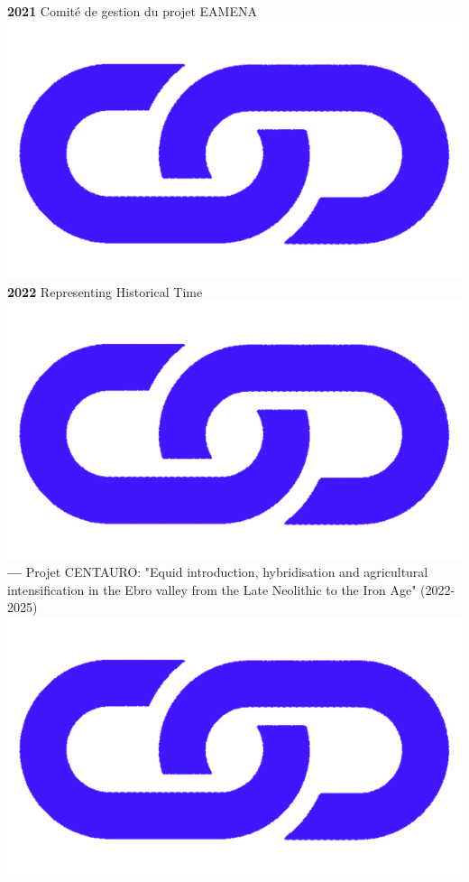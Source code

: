 \documentclass{article}
\begin{document}
\textbf{2021} Comité de gestion du projet EAMENA \href{https://eamena.org/}{\includegraphics[scale=0.02]{link_darkblue.png}}\\
\textbf{2022} Representing Historical Time \href{https://github.com/historical-time}{\includegraphics[scale=0.02]{link_darkblue.png}}\\
\textbf{--- } Projet CENTAURO: "Equid introduction, hybridisation and agricultural intensification in the Ebro valley from the Late Neolithic to the Iron Age" (2022-2025) \href{https://www.centaur-o.com/}{\includegraphics[scale=0.02]{link_darkblue.png}}\\
\end{document}
